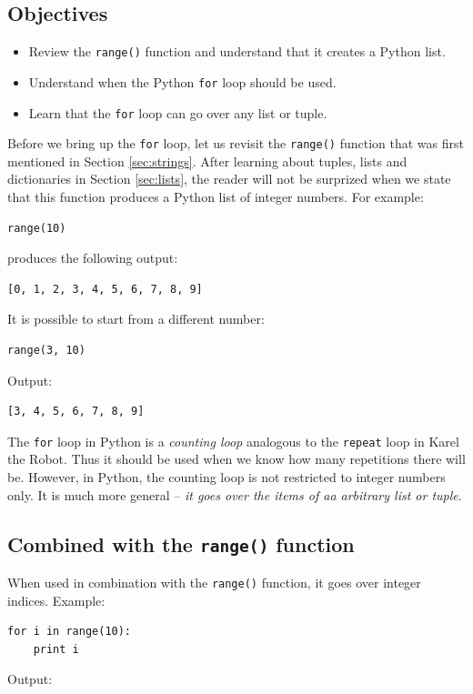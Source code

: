 \subsection{Objectives}

\begin{itemize}
\item Review the {\tt range()} function and understand that it creates a Python list.
\item Understand when the Python {\tt for} loop should be used.
\item Learn that the {\tt for} loop can go over any list or tuple.
\end{itemize}
Before we bring up the {\tt for} loop, let us revisit the {\tt range()}
function that was first mentioned in Section \ref{sec:strings}. After 
learning about tuples, lists and dictionaries in Section \ref{sec:lists}, the 
reader will not be surprized when we state that this function produces 
a Python list of integer numbers. For example:

\begin{verbatim}
range(10)
\end{verbatim}
produces the following output:

\begin{verbatim}
[0, 1, 2, 3, 4, 5, 6, 7, 8, 9]
\end{verbatim}
It is possible to start from a different number:

\begin{verbatim}
range(3, 10)
\end{verbatim}
Output:

\begin{verbatim}
[3, 4, 5, 6, 7, 8, 9]
\end{verbatim}
The {\tt for} loop in Python is a {\em counting loop} analogous to the {\tt repeat}
loop in Karel the Robot. Thus it should be used when we know how many repetitions there 
will be. However, in Python, the counting loop is not restricted to integer numbers 
only. It is much more general -- {\em it goes over the items of aa arbitrary list or tuple}. 

\subsection{Combined with the {\tt range()} function}

When used in combination with the {\tt range()} function, it goes over integer indices. 
Example:

\begin{verbatim}
for i in range(10):
    print i
\end{verbatim}
Output:


